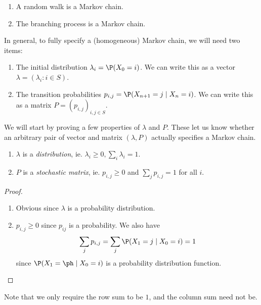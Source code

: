 \documentclass[a4paper]{article}
\begin{document}
\begin{eg}\leavevmode
  \begin{enumerate}
    \item A random walk is a Markov chain.
    \item The branching process is a Markov chain.
  \end{enumerate}
\end{eg}

In general, to fully specify a (homogeneous) Markov chain, we will need two items:
\begin{enumerate}
  \item The initial distribution $\lambda_i = \P(X_0 = i)$. We can write this as a vector $\lambda = (\lambda_i: i \in S)$.
  \item The transition probabilities $p_{i, j} = \P(X_{n + 1} = j \mid X_n = i)$. We can write this as a matrix $P = (p_{i, j})_{i, j\in S}$.
\end{enumerate}

We will start by proving a few properties of $\lambda$ and $P$. These let us know whether an arbitrary pair of vector and matrix $(\lambda, P)$ actually specifies a Markov chain.
\begin{prop}\leavevmode
  \begin{enumerate}
    \item $\lambda$ is a \emph{distribution}, ie. $\lambda_i \geq 0, \sum_i \lambda_i = 1$.
    \item $P$ is a \emph{stochastic matrix}, ie. $p_{i, j} \geq 0$ and $\sum_j p_{i, j} = 1$ for all $i$.
  \end{enumerate}
\end{prop}

\begin{proof}\leavevmode
  \begin{enumerate}
    \item Obvious since $\lambda$ is a probability distribution.
    \item $p_{i, j} \geq 0$ since $p_{ij}$ is a probability. We also have
      \[
        \sum_j p_{i,j} = \sum_j \P(X_{1} = j \mid X_0 = i) = 1
      \]
      since $\P(X_1 = \ph \mid X_0 = i)$ is a probability distribution function.
  \end{enumerate}
\end{proof}
Note that we only require the row sum to be $1$, and the column sum need not be.
\end{document}
